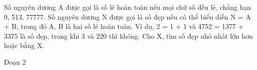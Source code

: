 Số nguyên dương A được gọi là số lẻ hoàn toàn nếu mọi chữ số đều lẻ, chẳng hạn 9, 513, 77777. Số nguyên dương N được gọi là số đẹp nếu có thể biểu diễn N = A + B, trong đó A, B là hai số lẻ hoàn toàn. Ví dụ, 2 = 1 + 1 và 4752 = 1377 + 3375 là số đẹp, trong khi 3 và 220 thì không. Cho X, tìm số đẹp nhỏ nhất lớn hơn hoặc bằng X.  

   Đoạn 2
